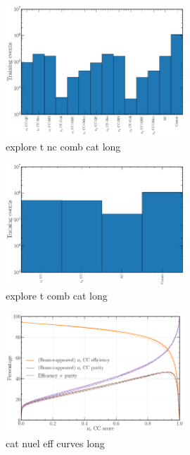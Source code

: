 \begin{figure} %
    \includegraphics[width=0.6\textwidth]{diagrams/7-cvn/chipsnet/explore_t_nc_comb_cat.pdf}
    \caption[explore t nc comb cat short]
    {explore t nc comb cat long}
    \label{fig:explore_t_nc_comb_cat}
\end{figure}

\begin{figure} %
    \includegraphics[width=0.6\textwidth]{diagrams/7-cvn/chipsnet/explore_t_comb_cat.pdf}
    \caption[explore t comb cat short]
    {explore t comb cat long}
    \label{fig:explore_t_comb_cat}
\end{figure}

\begin{figure} %
    \includegraphics[width=0.6\textwidth]{diagrams/7-cvn/chipsnet/cat_nuel_eff_curves.pdf}
    \caption[cat nuel eff curves short]
    {cat nuel eff curves long}
    \label{fig:cat_nuel_eff_curves}
\end{figure}

